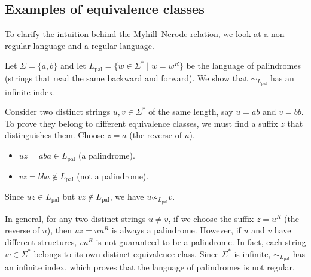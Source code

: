 \subsection{Examples of equivalence classes}

To clarify the intuition behind the Myhill--Nerode relation, we look at a non-regular language and a regular language.

\begin{example}
Let $\Sigma = \{a, b\}$ and let $L_{\text{pal}} = \{w \in \Sigma^* \mid w = w^R\}$ be the language of palindromes (strings that read the same backward and forward). We show that $\sim_{L_{\text{pal}}}$ has an infinite index.

Consider two distinct strings $u, v \in \Sigma^*$ of the same length, say $u = ab$ and $v = bb$. To prove they belong to different equivalence classes, we must find a suffix $z$ that distinguishes them. Choose $z = a$ (the reverse of $u$).
\begin{itemize}
  \item $uz = aba \in L_{\text{pal}}$ (a palindrome).
  \item $vz = bba \notin L_{\text{pal}}$ (not a palindrome).
\end{itemize}
Since $uz \in L_{\text{pal}}$ but $vz \notin L_{\text{pal}}$, we have $u \not\sim_{L_{\text{pal}}} v$. 

In general, for any two distinct strings $u \neq v$, if we choose the suffix $z = u^R$ (the reverse of $u$), then $uz = uu^R$ is always a palindrome. However, if $u$ and $v$ have different structures, $vu^R$ is not guaranteed to be a palindrome. In fact, each string $w \in \Sigma^*$ belongs to its own distinct equivalence class. Since $\Sigma^*$ is infinite, $\sim_{L_{\text{pal}}}$ has an infinite index, which proves that the language of palindromes is not regular.
\end{example}


